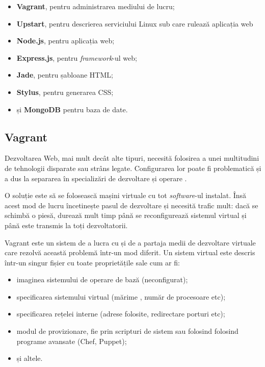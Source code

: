 \documentclass[a4wide,12pt]{report}
\newcommand{\eng}[1]{\emph{#1}} %
\newcommand{\acr}[1]{{\textsmaller[1]{\textsc{#1}}}} %
\begin{document}
\begin{itemize}

\item \textbf{Vagrant}, pentru administrarea mediului de lucru;

\item \textbf{Upstart}, pentru descrierea serviciului Linux sub care rulează
aplicația web

\item \textbf{Node.js}, pentru aplicația web;

\item \textbf{Express.js}, pentru \eng{framework}-ul web;

\item \textbf{Jade}, pentru șabloane HTML;

\item \textbf{Stylus}, pentru generarea CSS;

\item și \textbf{MongoDB} pentru baza de date.

\end{itemize}

\subsection{Vagrant}
\label{vagrantsub}

Dezvoltarea Web, mai mult decât alte tipuri, necesită folosirea a unei
multitudini de tehnologii disparate sau strâns legate. Configurarea lor poate fi
problematică și a dus la separarea în specializări de dezvoltare și operare
\acr{IT}.

O soluție este să se folosească mașini virtuale cu tot \eng{software}-ul
instalat. Însă acest mod de lucru încetinește pasul de dezvoltare și necesită
trafic mult: dacă se schimbă o piesă, durează mult timp până se reconfigurează
sistemul virtual și până este transmis la toți dezvoltatorii.

Vagrant este un sistem de a lucra cu și de a partaja medii de dezvoltare
virtuale care rezolvă această problemă într-un mod diferit. Un sistem virtual
este descris într-un singur fișier cu toate proprietățile sale cum ar fi:

\begin{itemize}

\item imaginea sistemului de operare de bază (neconfigurat);

\item specificarea sistemului virtual (mărime \acr{RAM}, număr de procesoare
etc);

\item specificarea rețelei interne (adrese \acr{IP} folosite, redirectare
porturi etc);

\item modul de provizionare, fie prin scripturi de sistem sau folosind folosind
programe avansate (Chef, Puppet);

\item și altele.

\end{itemize}
\end{document}
